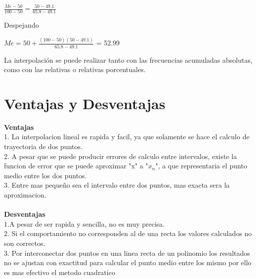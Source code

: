\documentclass{article}
\begin{document}
\begin{multicols}{2}
\begin{center}
$\frac{Me-50}{100-50}= \frac{50-49.1}{65.8-49.1}$
\end{center}

Despejando

\begin{center}
$Me=50+ \frac{(100-50)(50-49.1)}{65.8-49.1}$ = 52.99
\end{center}

La interpolación se puede realizar tanto con las frecuencias acumuladas absolutas, como con las relativas o relativas porcentuales.

\section{Ventajas y Desventajas}
\label{sec:Ven}
\textbf{Ventajas}
\\
1. La interpolacion lineal es rapida y facil, ya que solamente se hace el calculo de trayectoria de dos puntos.
\\
2. A pesar que se puede producir errores de calculo entre intervalos, existe la funcion de error que se puede aproximar "x"
a "$x_{n}$", a que representaria el punto medio entre los dos puntos.
\\
3. Entre mas pequeño sea el intervalo entre dos puntos, mas exacta sera la aproximacion.
\\
\\
\textbf{Desventajas}
\\
1.A pesar de ser rapida y sencilla, no es muy precisa.
\\
2. Si el comportamiento no corresponden al de una recta los valores calculados no son correctos.
\\
3. Por interconectar dos puntos en una linea recta de un polinomio los resultados no se ajustan con exactitud para calcular el punto medio entre los mismo por ello es mas efectivo el metodo cuadratico 

\end{multicols}
\end{document}
